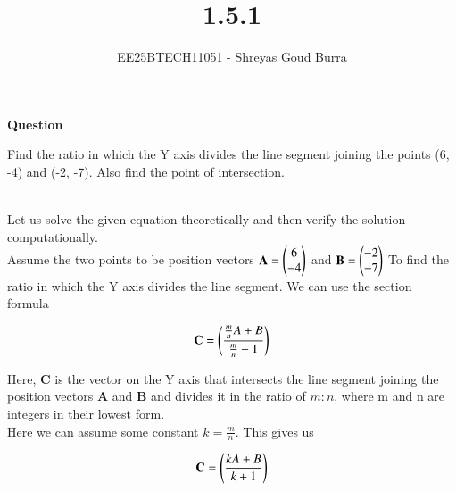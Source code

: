 \documentclass[journal]{IEEEtran}
\begin{document}

\vspace{3cm}

\title{1.5.1}
\author{EE25BTECH11051 - Shreyas Goud Burra}
\maketitle
{\let\newpage\relax\maketitle}

\renewcommand{\thefigure}{\theenumi}
\renewcommand{\thetable}{\theenumi}
\setlength{\intextsep}{10pt} %


\renewcommand{\thetable}{\theenumi}


\textbf{Question}

Find the ratio in which the Y axis divides the line segment joining the points (6, -4)
and (-2, -7). Also find the point of intersection.

\solution \\

Let us solve the given equation theoretically and then verify the solution computationally. \\

Assume the two points to be position vectors $\textbf{A} = \myvec{6 \\ -4}$ and $\textbf{B} = \myvec{-2 \\ -7}$
To find the ratio in which the Y axis divides the line segment. We can use the section formula

\begin{align}
    \textbf{C} = \brak{\frac{\frac{m}{n}A+B}{\frac{m}{n}+1}}
    \label{0.1}
\end{align}


Here, $\textbf{C}$ is the vector on the Y axis that intersects the line segment joining the position vectors $\textbf{A}$ and $\textbf{B}$ and divides it in the ratio of $m:n$, where m and n are integers in their lowest form.\\ 

Here we can assume some constant $k=\frac{m}{n}$. This gives us

\begin{align}
    \textbf{C} = \brak{\frac{kA+B}{k+1}}
    \label{0.2}
\end{align}
\end{document}
